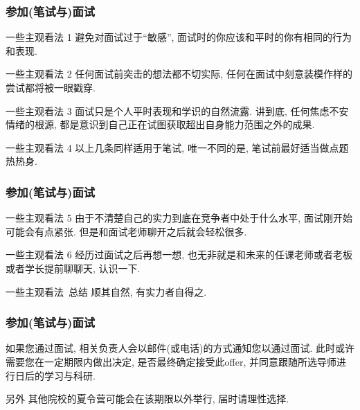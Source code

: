 \documentclass[Blue,dvipsnames]{beamer}
\begin{document}
    \begin{frame}
      \frametitle{参加(笔试与)面试}
      \small
      \begin{block}{一些主观看法 1}
        避免对面试过于``敏感'', 面试时的你应该和平时的你有相同的行为和表现.
      \end{block}
      \begin{alertblock}{一些主观看法 2}
        任何面试前突击的想法都不切实际, 任何在面试中刻意装模作样的尝试都将被一眼戳穿.
      \end{alertblock}
      \begin{block}{一些主观看法 3}
        面试只是个人平时表现和学识的自然流露. 讲到底, 任何焦虑不安情绪的根源, 都是意识到自己正在试图获取超出自身能力范围之外的成果.
      \end{block}
      \begin{block}{一些主观看法 4}
        以上几条同样适用于笔试, 唯一不同的是, 笔试前最好适当做点题热热身.
      \end{block}

      \end{frame}

      \begin{frame}
      \frametitle{参加(笔试与)面试}
      \begin{block}{一些主观看法 5}
        由于不清楚自己的实力到底在竞争者中处于什么水平, 面试刚开始可能会有点紧张. 但是和面试老师聊开之后就会轻松很多.
      \end{block}

      \begin{block}{一些主观看法 6}
        经历过面试之后再想一想, 也无非就是和未来的任课老师或者老板或者学长提前聊聊天, 认识一下.
      \end{block}

      \begin{block}{一些主观看法\  总结}
        顺其自然, 有实力者自得之.
      \end{block}
      \end{frame}

      \begin{frame}
        \frametitle{参加(笔试与)面试}
        如果您通过面试, 相关负责人会以邮件(或电话)的方式通知您以通过面试. 此时或许需要您在一定期限内做出决定, 是否最终确定接受此offer, 并同意跟随所选导师进行日后的学习与科研. 
        
        \begin{block}{另外}
          其他院校的夏令营可能会在该期限以外举行, 届时请理性选择.
        \end{block}
        
        \end{frame}
\end{document}
